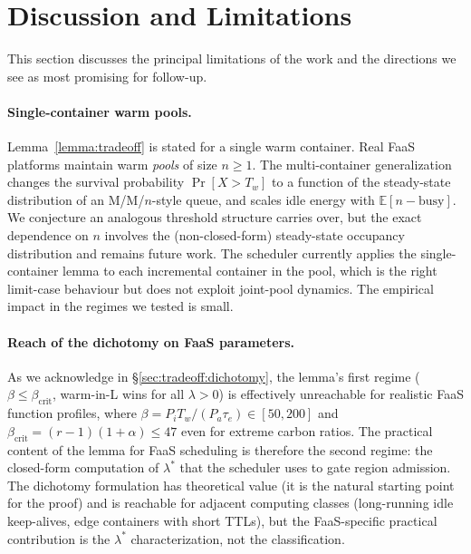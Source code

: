 \section{Discussion and Limitations}
\label{sec:discussion}

This section discusses the principal limitations of the work and the
directions we see as most promising for follow-up.

\paragraph{Single-container warm pools.} Lemma~\ref{lemma:tradeoff} is
stated for a single warm container. Real FaaS platforms maintain
warm \emph{pools} of size $n \ge 1$. The multi-container generalization
changes the survival probability $\Pr[X > T_w]$ to a function of the
steady-state distribution of an M/M/$n$-style queue, and scales idle
energy with $\mathbb{E}[n - \mathrm{busy}]$. We conjecture an
analogous threshold structure carries over, but the exact dependence
on $n$ involves the (non-closed-form) steady-state occupancy
distribution and remains future work. The scheduler currently applies
the single-container lemma to each incremental container in the pool,
which is the right limit-case behaviour but does not exploit
joint-pool dynamics. The empirical impact in the regimes we tested
is small.

\paragraph{Reach of the dichotomy on FaaS parameters.} As we
acknowledge in \S\ref{sec:tradeoff:dichotomy}, the lemma's first
regime ($\beta \le \beta_{\mathrm{crit}}$, warm-in-L wins for all
$\lambda > 0$) is effectively unreachable for realistic FaaS function
profiles, where $\beta = P_i T_w / (P_a \tau_e) \in [50, 200]$ and
$\beta_{\mathrm{crit}} = (r-1)(1+\alpha) \le 47$ even for extreme
carbon ratios. The practical content of the lemma for FaaS
scheduling is therefore the second regime: the closed-form
computation of $\lambda^*$ that the scheduler uses to gate region
admission. The dichotomy formulation has theoretical value (it is
the natural starting point for the proof) and is reachable for
adjacent computing classes (long-running idle keep-alives, edge
containers with short TTLs), but the FaaS-specific practical
contribution is the $\lambda^*$ characterization, not the
classification.

